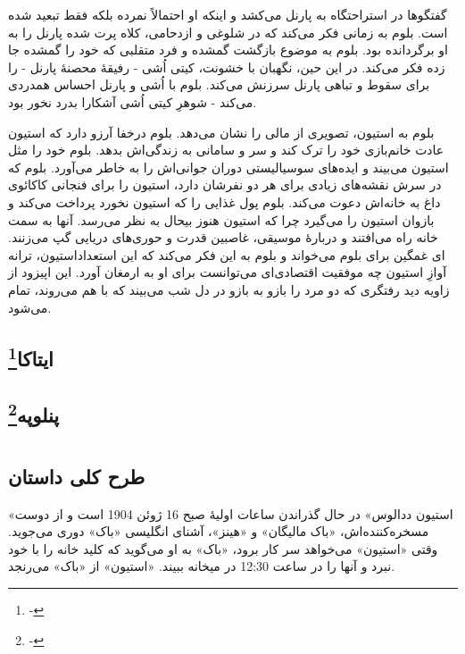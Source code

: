 \documentclass[12pt]{book}
\newcommand{\noun}[1]{«{#1}»}
\begin{document}
    گفتگوها در استراحتگاه به پارنل می‌کشد و اینکه او احتمالاً نمرده بلکه فقط تبعید شده است. بلوم به زمانی فکر می‌کند که در شلوغی و ازدحامی، کلاه پرت شده پارنل را به او برگردانده بود. بلوم به موضوع بازگشت گمشده و فرد متقلبی که خود را گمشده جا زده فکر می‌کند. در این حین، نگهبان با خشونت، کیتی اُشی - رفیقۀ محصنۀ پارنل - را برای سقوط و تباهی پارنل سرزنش می‌کند. بلوم با اُشی و پارنل احساس همدردی می‌کند - شوهرِ کیتی اُشی آشکارا بدرد نخور بود.

    بلوم به استیون، تصویری از مالی را نشان می‌دهد. بلوم درخفا آرزو دارد که استیون عادت خانم‌بازی خود را ترک کند و سر و سامانی به زندگی‌اش بدهد. بلوم خود را مثل استیون می‌بیند و ایده‌های سوسیالیستی دوران جوانی‌اش را به خاطر می‌آورد. بلوم که در سرش نقشه‌های زیادی برای هر دو نفرشان دارد، استیون را برای فنجانی کاکائوی داغ به خانه‌اش دعوت می‌کند. بلوم پول غذایی را که استیون نخورد پرداخت می‌کند و بازوان استیون را می‌گیرد چرا که استیون هنوز بیحال به نظر می‌رسد. آنها به سمت خانه راه می‌افتند و دربارۀ موسیقی، غاصبین قدرت و حوری‌های دریایی گپ می‌زنند. استیون، ترانه‎‌ای غمگین برای بلوم می‌خواند و بلوم به این فکر می‌کند که این استعداد آوازِ استیون چه موفقیت اقتصادی‌ای می‌توانست برای او به ارمغان آورد. این اپیزود از زاویه دید رفتگری که دو مرد را بازو به بازو در دل شب می‌بیند که با هم می‌روند، تمام می‌شود.

    \chapter[ایتاکا]{ایتاکا\protect\footnote{-}}\label{ep:17}

    \chapter[پنلوپه]{پنلوپه\protect\footnote{-}}\label{ep:18}

    \part{}
    \chapter{طرح کلی داستان}
    \noun{استیون ددالوس} در حال گذراندن ساعات اولیۀ صبح 16 ژوئن 1904 است و از دوست مسخره‌کننده‌اش، \noun{باک مالیگان} و \noun{هینز}، آشنای انگلیسی \noun{باک} دوری می‌جوید. وقتی \noun{استیون} می‌خواهد سر کار برود، \noun{باک} به او می‌گوید که کلید خانه را با خود نبرد و آنها را در ساعت 12:30 در میخانه ببیند. \noun{استیون} از \noun{باک} می‌رنجد.
\end{document}
